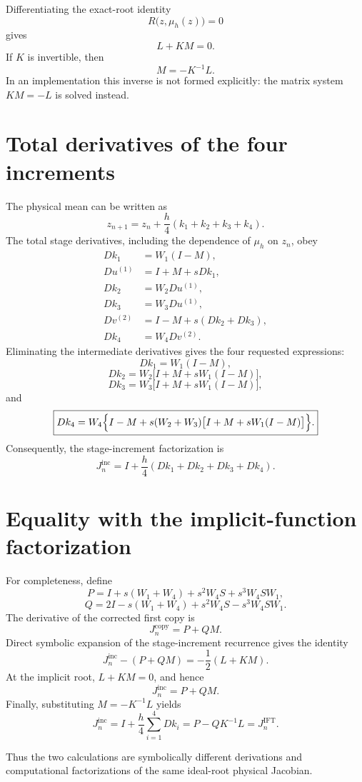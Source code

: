 \documentclass[11pt,a4paper]{article}
\newcommand{\Id}{I}
\begin{document}
Differentiating the exact-root identity
\[
 R\bigl(z,\mu_h(z)\bigr)=0
\]
gives
\[
 L+KM=0.
\]
If $K$ is invertible, then
\[
 \boxed{M=-K^{-1}L.}
\]
In an implementation this inverse is not formed explicitly: the matrix system
$KM=-L$ is solved instead.

\section{Total derivatives of the four increments}

The physical mean can be written as
\[
 z_{n+1}=z_n+\frac h4(k_1+k_2+k_3+k_4).
\]
The total stage derivatives, including the dependence of $\mu_h$ on $z_n$, obey
\[
 \begin{aligned}
 Dk_1&=W_1(\Id-M),\\
 Du^{(1)}&=\Id+M+sDk_1,\\
 Dk_2&=W_2Du^{(1)},\\
 Dk_3&=W_3Du^{(1)},\\
 Dv^{(2)}&=\Id-M+s(Dk_2+Dk_3),\\
 Dk_4&=W_4Dv^{(2)}.
 \end{aligned}
\]
Eliminating the intermediate derivatives gives the four requested expressions:
\[
 \boxed{Dk_1=W_1(\Id-M),}
\]
\[
 \boxed{
 Dk_2=W_2\bigl[\Id+M+sW_1(\Id-M)\bigr],
 }
\]
\[
 \boxed{
 Dk_3=W_3\bigl[\Id+M+sW_1(\Id-M)\bigr],
 }
\]
and
\[
 \boxed{
 Dk_4=W_4\Bigl\{
 \Id-M+s(W_2+W_3)
 \bigl[\Id+M+sW_1(\Id-M)\bigr]
 \Bigr\}.
 }
\]
Consequently, the stage-increment factorization is
\[
 \boxed{
 J_n^{\mathrm{inc}}
 =\Id+\frac h4(Dk_1+Dk_2+Dk_3+Dk_4).
 }
\]

\section{Equality with the implicit-function factorization}

For completeness, define
\[
 \boxed{
 P=\Id+s(W_1+W_4)+s^2W_4S+s^3W_4SW_1,
 }
\]
\[
 \boxed{
 Q=2\Id-s(W_1+W_4)+s^2W_4S-s^3W_4SW_1.
 }
\]
The derivative of the corrected first copy is
\[
 J_n^{\mathrm{copy}}=P+QM.
\]
Direct symbolic expansion of the stage-increment recurrence gives the identity
\[
 \boxed{
 J_n^{\mathrm{inc}}-(P+QM)=-\frac12(L+KM).
 }
\]
At the implicit root, $L+KM=0$, and hence
\[
 J_n^{\mathrm{inc}}=P+QM.
\]
Finally, substituting $M=-K^{-1}L$ yields
\[
 \boxed{
 J_n^{\mathrm{inc}}
 =\Id+\frac h4\sum_{i=1}^{4}Dk_i
 =P-QK^{-1}L
 =J_n^{\mathrm{IFT}}.
 }
\]

Thus the two calculations are symbolically different derivations and computational
factorizations of the same ideal-root physical Jacobian.
\end{document}
